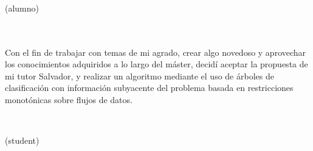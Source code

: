 \chapter*{}






\cleardoublepage
\thispagestyle{empty}

\begin{center}
{\large\bfseries \myTitle}\\
\end{center}
\begin{center}
\myName(alumno)\\
\end{center}

\\

\vspace{0.7cm}
\\

Con el fin de trabajar con temas de mi agrado, crear algo novedoso y aprovechar los conocimientos adquiridos a lo largo del máster, decidí aceptar la propuesta de mi tutor Salvador, y realizar un algoritmo mediante el uso de árboles de clasificación con información subyacente del problema basada en restricciones monotónicas sobre flujos de datos.\\

\cleardoublepage


\thispagestyle{empty}


\begin{center}
{\large\bfseries \myTitleEng}\\
\end{center}
\begin{center}
\myName (student)\\
\end{center}

\\

\vspace{0.7cm}
\\

